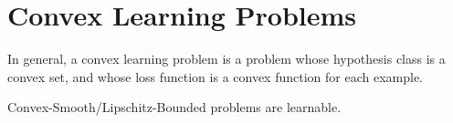 \section{Convex Learning Problems}

In general, a convex learning problem is a problem whose hypothesis class is a
convex set, and whose loss function is a convex function for each example.

Convex-Smooth/Lipschitz-Bounded
problems are learnable.
